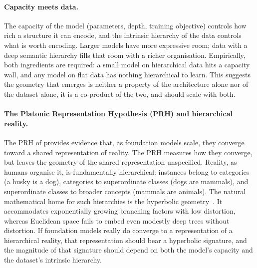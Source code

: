 \documentclass{article}
\begin{document}
\paragraph{Capacity meets data.} The capacity of the model (parameters, depth, training objective) controls how rich a structure it can encode, and the intrinsic hierarchy of the data controls what is worth encoding. Larger models have more expressive room; data with a deep semantic hierarchy fills that room with a richer organisation. Empirically, both ingredients are required: a small model on hierarchical data hits a capacity wall, and any model on flat data has nothing hierarchical to learn. This suggests the geometry that emerges is neither a property of the architecture alone nor of the dataset alone, it is a co-product of the two, and should scale with both.


\paragraph{The Platonic Representation Hypothesis (PRH) and hierarchical reality.} The PRH of \citet{huh2024platonic} provides evidence that, as foundation models scale, they converge toward a shared representation of reality. The PRH measures how they converge, but leaves the geometry of the shared representation unspecified. Reality, as humans organise it, is fundamentally hierarchical: instances belong to categories (a husky is a dog), categories to superordinate classes (dogs are mammals), and superordinate classes to broader concepts (mammals are animals). The natural mathematical home for such hierarchies is the hyperbolic geometry~\citep{nickel2017poincare, sarkar2011low}. It accommodates exponentially growing branching factors with low distortion, whereas Euclidean space fails to embed even modestly deep trees without distortion. If foundation models really do converge to a representation of a hierarchical reality, that representation should bear a hyperbolic signature, and the magnitude of that signature should depend on both the model's capacity and the dataset's intrinsic hierarchy.
\end{document}
